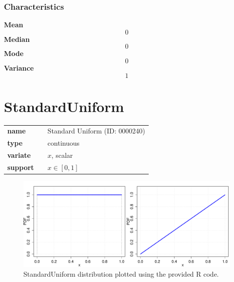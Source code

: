 \subsubsection*{Characteristics}
\smallskip \noindent \hspace{.2cm} \textbf{Mean} 
\begin{equation*}0\end{equation*}
\smallskip \noindent \hspace{.2cm} \textbf{Median} 
\begin{equation*}0\end{equation*}
\smallskip \noindent \hspace{.2cm} \textbf{Mode} 
\begin{equation*}0\end{equation*}
\smallskip \noindent \hspace{.2cm} \textbf{Variance} 
\begin{equation*}1\end{equation*}
\smallskip
\section*{StandardUniform} 

  \bigskip 

\begin{tabular}{p{2cm}cl}
\textbf{name} & & Standard Uniform (ID: 0000240)\\ 
 
\textbf{type} & & continuous \\ 

\textbf{variate} & & $x$, scalar \\ 

\textbf{support} & & $x \in [0,1]$
\end{tabular}

\begin{figure}[ht!]
\centering
  \includegraphics[width=140mm]{pics/StandardUniform.pdf}
 \caption{StandardUniform distribution plotted using the provided R code.}
 \label{fig:StandardUniform}
\end{figure}

